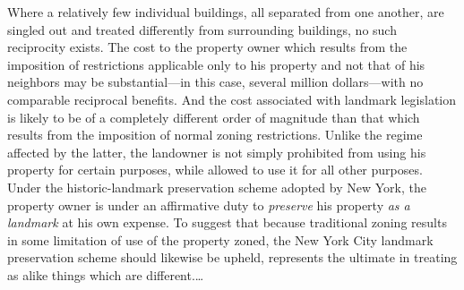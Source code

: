 Where a relatively few individual buildings, all separated from one another, are
singled out and treated differently from surrounding buildings, no such
reciprocity exists. The cost to the property owner which results from the
imposition of restrictions applicable only to his property and not that of his
neighbors may be substantial---in this case, several million dollars---with no
comparable reciprocal benefits. And the cost associated with landmark
legislation is likely to be of a completely different order of magnitude than
that which results from the imposition of normal zoning restrictions. Unlike the
regime affected by the latter, the landowner is not simply prohibited from using
his property for certain purposes, while allowed to use it for all other
purposes. Under the historic-landmark preservation scheme adopted by New York,
the property owner is under an affirmative duty to \textit{preserve} his
property \textit{as a landmark} at his own expense. To suggest that because
traditional zoning results in some limitation of use of the property zoned, the
New York City landmark preservation scheme should likewise be upheld, represents
the ultimate in treating as alike things which are different.\ldots


